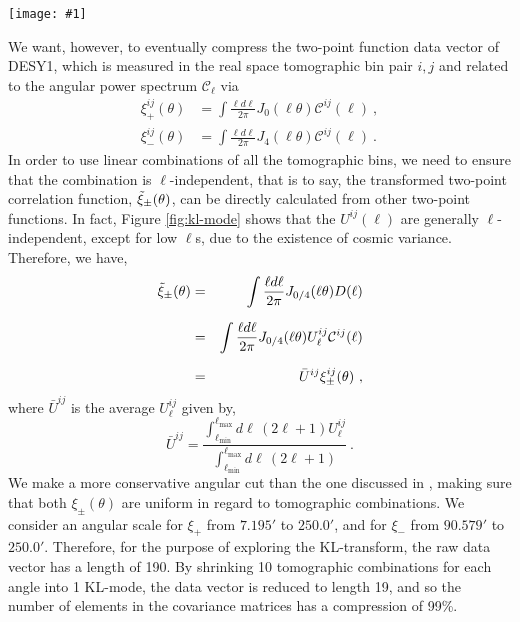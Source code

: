 \documentclass[aps, prd, twocolumn, superscriptaddress, nofootinbib, amssymb, amsmath]{revtex4-2}
\newcommand{\sfig}[2]{
	\texttt{[image: \#1]}
}
\newcommand{\rf}[1]{Figure \ref{fig:#1}}
\newcommand\be{\begin{equation}}
\newcommand\ee{\end{equation}}
\newcommand\bea{\begin{eqnarray}}
\newcommand\eea{\end{eqnarray}}
\newcommand\ctot{\mathcal{C}}
\begin{document}
\begin{figure*}[thbp]
	\sfig{kl-mode.pdf}{0.8\textwidth}
	\caption{\textbf{Left:} Column vectors of the matrix $R_{\ell}$, or $e^p_{\ell} N^{-\frac{1}{2}}$, for compressing the shear power spectrum $\ctot_{\ell}$.
		\textbf{Right:} Transformation on tomographic bin combination $U_{ij}$ constructed from the KL-eigenmodes. For both plots, the dashed black lines are the weighted average of each mode. The lightest shade represents $\ell = 10$ and the increment is $\Delta \ell = 10$ for each darker shade.}
	\label{fig:kl-mode}
\end{figure*}

We want, however, to eventually compress the two-point function data vector of DESY1, which is measured in the real space tomographic bin pair ${i, j}$ and related to the angular power spectrum $\ctot_{\ell}$ via
\be
\begin{split}
	\xi_{+}^{ij}(\theta) &= \int \frac{\ell d \ell }{2\pi}J_{0}(\ell \theta) \ctot^{ij}(\ell)\ , \\[2ex]
	\xi_{-}^{ij}(\theta) &= \int \frac{\ell d \ell }{2\pi}J_{4}(\ell \theta) \ctot^{ij}(\ell)\ 
	.\end{split}
\ee
In order to use linear combinations of all the tomographic bins, we need to ensure that the combination is $\ell$-independent, that is to say, the transformed two-point correlation function, $\Tilde{\xi}_{\pm}(\theta)$, can be directly calculated from other two-point functions. In fact, \rf{kl-mode} shows that the $U^{ij}(\ell)$ are generally $\ell$-independent, except for low $\ell$s, due to the existence of cosmic variance. Therefore, we have,
\bea
\nonumber \Tilde{\xi}_{\pm}(\theta) &=& \int \frac{\ell d \ell }{2\pi}J_{0/4}(\ell \theta) D(\ell)\\[1.5ex]
\nonumber &=&\int \frac{\ell d \ell }{2\pi}J_{0/4}(\ell \theta) U^{ij}_\ell \ctot^{ij}(\ell)\\[1.5ex]
&=&\bar{U}^{ij}\xi_{\pm}^{ij}(\theta)\
,\eea
where $\bar{U}^{ij}$ is the average $U^{ij}_{\ell}$ given by,
\be
\bar{U}^{ij} = \frac{\int_{\ell _{\text{min}}}^{\ell _{\text{max}}} d\ell\, (2 \ell +1) U^{ij}_{\ell}}{\int_{\ell _{\text{min}}}^{\ell _{\text{max}}} d\ell\, (2 \ell +1)}\
.\ee
We make a more conservative angular cut than the one discussed in \cite{Troxel:2017xyo}, making sure that both $\xi_{\pm}(\theta)$ are uniform in regard to tomographic combinations. We consider an angular scale for  $\xi_+$ from $7.195'$ to $250.0'$, and for $\xi_-$ from $90.579'$ to $250.0'$. Therefore, for the purpose of exploring the KL-transform, the raw data vector has a length of 190. By shrinking 10 tomographic combinations for each angle into 1 KL-mode, the data vector is reduced to length 19, and so the number of elements in the covariance matrices has a compression of 99\%.
\end{document}
